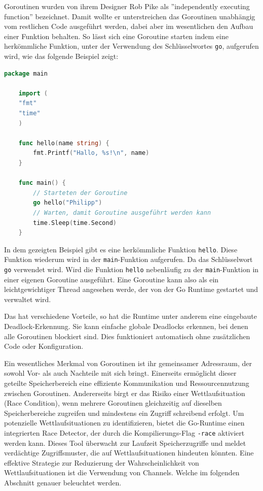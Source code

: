 \documentclass[fontsize=12pt,paper=a4,twoside=semi,parskip=half-,headsepline,headinclude]{scrreprt}
\begin{document}
Goroutinen wurden von ihrem Designer Rob Pike als ''independently executing function'' bezeichnet. Damit wollte er unterstreichen das Goroutinen unabhängig vom restlichen Code ausgeführt werden, dabei aber im wesentlichen den Aufbau einer Funktion behalten. So lässt sich eine Goroutine starten indem eine herkömmliche Funktion, unter der Verwendung des Schlüsselwortes \texttt{go}, aufgerufen wird, wie das folgende Beispiel zeigt:

\begin{lstlisting}[language=Go,extendedchars=true]
	package main
	
	import (
	"fmt"
	"time"
	)
	
	func hello(name string) {
		fmt.Printf("Hallo, %s!\n", name)
	}
	
	func main() {
		// Starteten der Goroutine
		go hello("Philipp")
		// Warten, damit Goroutine ausgeführt werden kann
		time.Sleep(time.Second)
	}
\end{lstlisting}

In dem gezeigten Beispiel gibt es eine herkömmliche Funktion \texttt{hello}. Diese Funktion wiederum wird in der \texttt{main}-Funktion aufgerufen. Da das Schlüsselwort \texttt{go} verwendet wird. Wird die Funktion \texttt{hello} nebenläufig zu der \texttt{main}-Funktion in einer eigenen Goroutine ausgeführt. Eine Goroutine kann also als ein leichtgewichtiger Thread angesehen werde, der von der Go Runtime gestartet und verwaltet wird. 

Das hat verschiedene Vorteile, so hat die Runtime unter anderem eine eingebaute Deadlock-Erkennung. Sie kann einfache globale Deadlocks erkennen, bei denen alle Goroutinen blockiert sind. Dies funktioniert automatisch ohne zusätzlichen Code oder Konfiguration.

Ein wesentliches Merkmal von Goroutinen ist ihr gemeinsamer Adressraum, der sowohl Vor- als auch Nachteile mit sich bringt. Einerseits ermöglicht dieser geteilte Speicherbereich eine effiziente Kommunikation und Ressourcennutzung zwischen Goroutinen. Andererseits birgt er das Risiko einer Wettlaufsituation (Race Condition), wenn mehrere Goroutinen gleichzeitig auf dieselben Speicherbereiche zugreifen und mindestens ein Zugriff schreibend erfolgt. Um potenzielle Wettlaufsituationen zu identifizieren, bietet die Go-Runtime einen integrierten Race Detector, der durch die Kompilierungs-Flag \texttt{-race} aktiviert werden kann. Dieses Tool überwacht zur Laufzeit Speicherzugriffe und meldet verdächtige Zugriffsmuster, die auf Wettlaufsituationen hindeuten könnten. Eine effektive Strategie zur Reduzierung der Wahrscheinlichkeit von Wettlaufsituationen ist die Verwendung von Channels. Welche im folgenden Abschnitt genauer beleuchtet werden.
\end{document}
